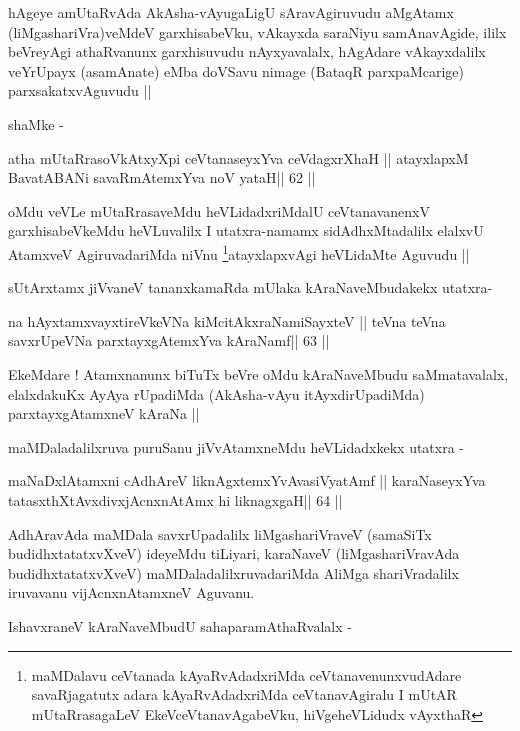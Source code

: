 \begin{artha}
hAgeye amUtaRvAda AkAsha-vAyugaLigU sAravAgiruvudu aMgAtamx
(liMgashariVra)veMdeV garxhisabeVku, vAkayxda saraNiyu samAnavAgide,
ililx beVreyAgi athaRvanunx garxhisuvudu nAyxyavalalx, hAgAdare
vAkayxdalilx veYrUpayx (asamAnate) eMba doVSavu nimage (BataqR
parxpaMcarige) parxsakatxvAguvudu ||

shaMke -
\end{artha}

\begin{shl}
atha mUtaRrasoVkAtxyX\s pi ceVtanaseyxYva ceVdagxrXhaH ||
atayxlapxM BavatA\s BANi savaRmAtemxYva noV yataH\hfill || 62 ||
\end{shl}

\begin{artha}
oMdu veVLe mUtaRrasaveMdu heVLidadxriMdalU ceVtanavanenxV
garxhisabeVkeMdu heVLuvalilx I utatxra-namamx sidAdhxMtadalilx elalxvU
AtamxveV AgiruvadariMda niVnu \footnote{maMDalavu ceVtanada
kAyaRvAdadxriMda ceVtanavenunxvudAdare savaRjagatutx adara
kAyaRvAdadxriMda ceVtanavAgiralu I mUtAR mUtaRrasagaLeV
EkeVceVtanavAgabeVku, hiVgeheVLidudx vAyxthaR}atayxlapxvAgi heVLidaMte
Aguvudu ||

sUtArxtamx jiVvaneV tananxkamaRda mUlaka kAraNaveMbudakekx utatxra-
\end{artha}

\begin{shl}
na hAyxtamxvayxtireVkeVNa kiMcitAkxraNamiSayxteV ||
teVna teVna savxrUpeVNa parxtayxgAtemxYva kAraNamf\hfill || 63 ||
\end{shl}

\begin{artha}
EkeMdare ! Atamxnanunx biTuTx beVre oMdu kAraNaveMbudu saMmatavalalx,
elalxdakuKx AyAya rUpadiMda (AkAsha-vAyu itAyxdirUpadiMda)
parxtayxgAtamxneV kAraNa ||

maMDaladalilxruva puruSanu jiVvAtamxneMdu heVLidadxkekx utatxra -
\end{artha}

\begin{shl}
maNaDxlAtamxni cA\s\s dhAreV liknAgxtemxYvAvasiVyatAmf ||
karaNaseyxYva tatasxthXtAvxdivxjAcnxnAtAmx hi liknagxgaH\hfill || 64 ||
\end{shl}

\begin{artha}
AdhAravAda maMDala savxrUpadalilx liMgashariVraveV (samaSiTx
budidhxtatatxvXveV) ideyeMdu tiLiyari, karaNaveV (liMgashariVravAda
budidhxtatatxvXveV) maMDaladalilxruvadariMda AliMga shariVradalilx
iruvavanu vijAcnxnAtamxneV Aguvanu.

IshavxraneV kAraNaveMbudU sahaparamAthaRvalalx -
\end{artha}

